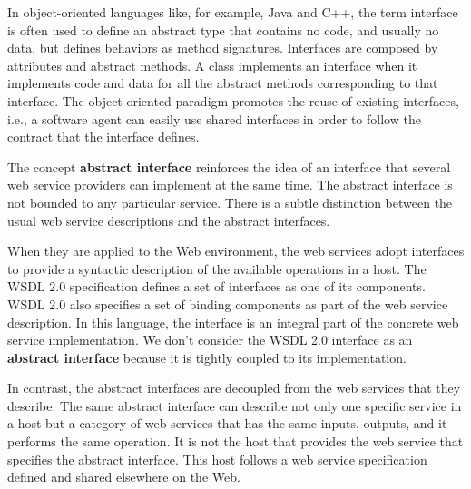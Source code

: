 \documentclass{singlecol-new}
\theoremstyle{TH}{
\newtheorem{lemma}{Lemma}
\newtheorem{theorem}[lemma]{Theorem}
\newtheorem{corrolary}[lemma]{Corrolary}
\newtheorem{conjecture}[lemma]{Conjecture}
\newtheorem{proposition}[lemma]{Proposition}
\newtheorem{claim}[lemma]{Claim}
\newtheorem{stheorem}[lemma]{Wrong Theorem}
\newtheorem{algorithm}{Algorithm}
}
\theoremstyle{THrm}{
\newtheorem{definition}{Definition}[section]
\newtheorem{question}{Question}[section]
\newtheorem{remark}{Remark}
\newtheorem{scheme}{Scheme}
}
\theoremstyle{THhit}{
\newtheorem{case}{Case}[section]
}
\begin{document}
In object-oriented languages like, for example, Java and C++, the term interface is often used to define an abstract type that contains no code, and usually no data, but defines behaviors as method signatures. 
Interfaces are composed by attributes and abstract methods.
A class implements an interface when it implements code and data for all the abstract methods corresponding to that interface. 
The object-oriented paradigm promotes the reuse of existing interfaces, i.e., a software agent can easily use shared interfaces in order to follow the contract that the interface defines.


The concept \textbf{abstract interface} reinforces the idea of an interface that several web service providers can implement at the same time. The abstract interface is not bounded to any particular service. 
There is a subtle distinction between the usual web service descriptions and the abstract interfaces. 

When they are applied to the Web environment, the web services adopt interfaces to provide a syntactic description of the available operations in a host.  
The WSDL 2.0 specification defines a set of interfaces as one of its components. WSDL 2.0 also specifies a set of binding components as part of the web service description. In this language, the interface is an integral part of the concrete web service implementation.
We don't consider the WSDL 2.0 interface as an \textbf{abstract interface} because it is tightly coupled to its implementation. 

In contrast, the abstract interfaces are decoupled from the web services that they describe. 
The same abstract interface can describe not only one specific service in a host but a category of web services that has the same inputs, outputs, and it performs the same operation.
It is not the host that provides the web service that specifies the abstract interface. 
This host follows a web service specification defined and shared elsewhere on the Web. 
\end{document}
